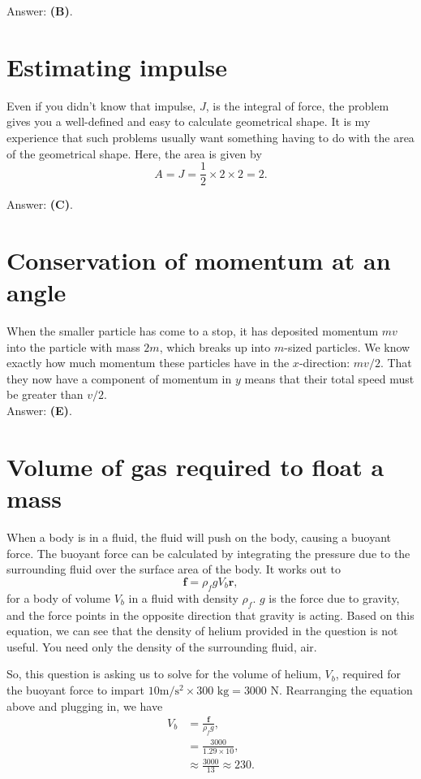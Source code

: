 \documentclass[11pt]{paper}
\newcommand{\answer}[1]{Answer: \textbf{(#1)}.}
\begin{document}
\answer{B}


\section{Estimating impulse}
Even if you didn't know that impulse, $J$, is the integral of force, the problem gives you a well-defined and easy to calculate geometrical shape.  It is my experience that such problems usually want something having to do with the area of the geometrical shape.  Here, the area is given by
\begin{equation}
A = J = \frac{1}{2}\times2\times2 = 2.
\end{equation}

\answer{C}

\section{Conservation of momentum at an angle}
When the smaller particle has come to a stop, it has deposited momentum $mv$ into the particle with mass $2m$, which breaks up into $m$-sized particles.  We know exactly how much momentum these particles have in the $x$-direction: $mv/2$.  That they now have a component of momentum in $y$ means that their total speed must be greater than $v/2$.\\

\answer{E}

\section{Volume of gas required to float a mass}
When a body is in a fluid, the fluid will push on the body, causing a buoyant force.  The buoyant force can be calculated by integrating the pressure due to the surrounding fluid over the surface area of the body.  It works out to
\begin{equation}
\mathbf{f} = \rho_f g V_b \mathbf{\hat{r}},
\end{equation}
for a body of volume $V_b$ in a fluid with density $\rho_f$.  $g$ is the force due to gravity, and the force points in the opposite direction that gravity is acting.  Based on this equation, we can see that the density of helium provided in the question is not useful.  You need only the density of the surrounding fluid, air.

So, this question is asking us to solve for the volume of helium, $V_b$, required for the buoyant force to impart $10\text{m}/\text{s}^2 \times 300 \text{ kg} = 3000 \text{ N}$.  Rearranging the equation above and plugging in, we have
\begin{align}
V_b &= \frac{\mathbf{f}}{\rho_f g},\\
&= \frac{3000}{1.29 \times 10},\\
&\approx \frac{3000}{13} \approx 230.\\
\end{align}
\end{document}
